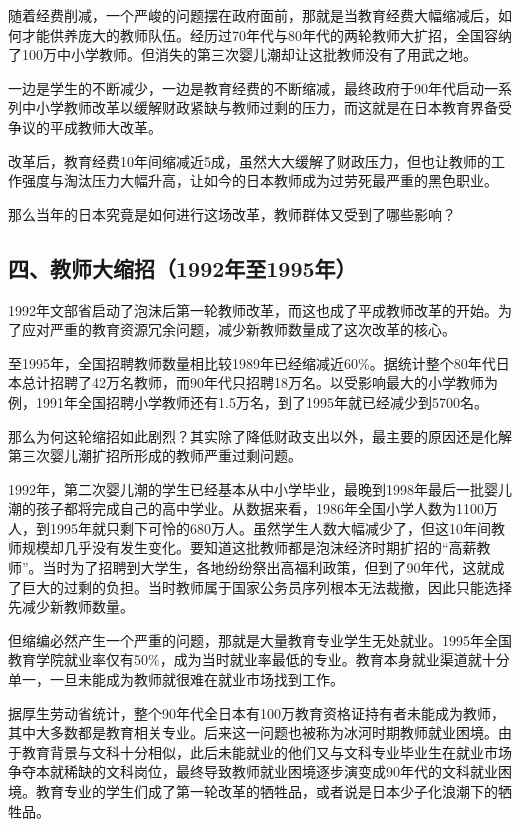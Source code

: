 随着经费削减，一个严峻的问题摆在政府面前，那就是当教育经费大幅缩减后，如何才能供养庞大的教师队伍。经历过70年代与80年代的两轮教师大扩招，全国容纳了100万中小学教师。但消失的第三次婴儿潮却让这批教师没有了用武之地。

一边是学生的不断减少，一边是教育经费的不断缩减，最终政府于90年代启动一系列中小学教师改革以缓解财政紧缺与教师过剩的压力，而这就是在日本教育界备受争议的平成教师大改革。

改革后，教育经费10年间缩减近5成，虽然大大缓解了财政压力，但也让教师的工作强度与淘汰压力大幅升高，让如今的日本教师成为过劳死最严重的黑色职业。

那么当年的日本究竟是如何进行这场改革，教师群体又受到了哪些影响？

\subsection{四、教师大缩招（1992年至1995年）}

1992年文部省启动了泡沫后第一轮教师改革，而这也成了平成教师改革的开始。为了应对严重的教育资源冗余问题，减少新教师数量成了这次改革的核心。

至1995年，全国招聘教师数量相比较1989年已经缩减近60\%。据统计整个80年代日本总计招聘了42万名教师，而90年代只招聘18万名。以受影响最大的小学教师为例，1991年全国招聘小学教师还有1.5万名，到了1995年就已经减少到5700名。

那么为何这轮缩招如此剧烈？其实除了降低财政支出以外，最主要的原因还是化解第三次婴儿潮扩招所形成的教师严重过剩问题。

1992年，第二次婴儿潮的学生已经基本从中小学毕业，最晚到1998年最后一批婴儿潮的孩子都将完成自己的高中学业。从数据来看，1986年全国小学人数为1100万人，到1995年就只剩下可怜的680万人。虽然学生人数大幅减少了，但这10年间教师规模却几乎没有发生变化。要知道这批教师都是泡沫经济时期扩招的“高薪教师”。当时为了招聘到大学生，各地纷纷祭出高福利政策，但到了90年代，这就成了巨大的过剩的负担。当时教师属于国家公务员序列根本无法裁撤，因此只能选择先减少新教师数量。

但缩编必然产生一个严重的问题，那就是大量教育专业学生无处就业。1995年全国教育学院就业率仅有50\%，成为当时就业率最低的专业。教育本身就业渠道就十分单一，一旦未能成为教师就很难在就业市场找到工作。

据厚生劳动省统计，整个90年代全日本有100万教育资格证持有者未能成为教师，其中大多数都是教育相关专业。后来这一问题也被称为冰河时期教师就业困境。由于教育背景与文科十分相似，此后未能就业的他们又与文科专业毕业生在就业市场争夺本就稀缺的文科岗位，最终导致教师就业困境逐步演变成90年代的文科就业困境。教育专业的学生们成了第一轮改革的牺牲品，或者说是日本少子化浪潮下的牺牲品。

